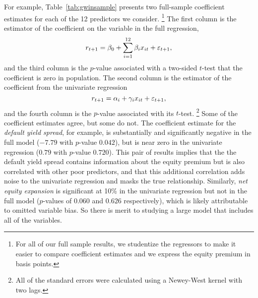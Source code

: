 \documentclass[12pt]{article}
\begin{document}
For example, Table~\ref{tab:gwinsample} presents two full-sample
coefficient estimates for each of the 12 predictors we consider.%
\footnote{For all of our full sample results, we studentize the
  regressors to make it easier to compare coefficient estimates and we
  express the equity premium in basis points.} %
The first column is the estimator of the coefficient on the
variable in the full regression,
\begin{equation*}
  r_{t+1} = \beta_0 + \sum_{i=1}^{12} \beta_{i} x_{it} + \varepsilon_{t+1},
\end{equation*}
and the third column is the $p$-value associated with a two-sided
$t$-test that the coefficient is zero in population. The second column
is the estimator of the coefficient from the univariate regression
\begin{equation*}
  r_{t+1} = \alpha_i + \gamma_{i} x_{it} + \varepsilon_{t+1},
\end{equation*}
and the fourth column is the $p$-value associated with its $t$-test.%
\footnote{All of the standard errors were calculated using a
  Newey-West kernel with two lags.} %
Some of the coefficient estimates agree, but some do not. The
coefficient estimate for the \emph{default yield spread}, for example,
is substantially and significantly negative in the full model ($-7.79$
with $p$-value $0.042$), but is near zero in the univariate regression
($0.79$ with $p$-value $0.720$). This pair of results implies that the
the default yield spread contains information about the equity premium
but is also correlated with other poor predictors, and that this
additional correlation adds noise to the univariate regression
and masks the true relationship. Similarly, \emph{net equity expansion}
is significant at 10\% in the univariate regression but not in the
full model ($p$-values of $0.060$ and $0.626$ respectively), which is
likely attributable to omitted variable bias. So there is merit to
studying a large model that includes all of the variables.
\end{document}

